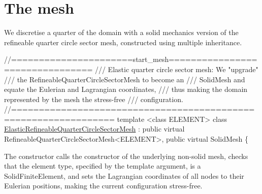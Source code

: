  

\hypertarget{index_mesh}{}\section{The mesh}\label{index_mesh}
We discretise a quarter of the domain with a solid mechanics version of the refineable quarter circle sector mesh, constructed using multiple inheritance.

 
\begin{DoxyCodeInclude}
\textcolor{comment}{//======================start\_mesh================================}
\textcolor{comment}{/// Elastic quarter circle sector mesh: We "upgrade"}
\textcolor{comment}{}\textcolor{comment}{/// the RefineableQuarterCircleSectorMesh to become an}
\textcolor{comment}{}\textcolor{comment}{/// SolidMesh and equate the Eulerian and Lagrangian coordinates,}
\textcolor{comment}{}\textcolor{comment}{/// thus making the domain represented by the mesh the stress-free }
\textcolor{comment}{}\textcolor{comment}{/// configuration. }
\textcolor{comment}{}\textcolor{comment}{//================================================================}
\textcolor{keyword}{template} <\textcolor{keyword}{class} ELEMENT>
\textcolor{keyword}{class }\hyperlink{classElasticRefineableQuarterCircleSectorMesh}{ElasticRefineableQuarterCircleSectorMesh} :
 \textcolor{keyword}{public} \textcolor{keyword}{virtual} RefineableQuarterCircleSectorMesh<ELEMENT>,
 \textcolor{keyword}{public} \textcolor{keyword}{virtual} SolidMesh
\{

\end{DoxyCodeInclude}


The constructor calls the constructor of the underlying non-\/solid mesh, checks that the element type, specified by the template argument, is a {\ttfamily Solid\+Finite\+Element}, and sets the Lagrangian coordinates of all nodes to their Eulerian positions, making the current configuration stress-\/free.



